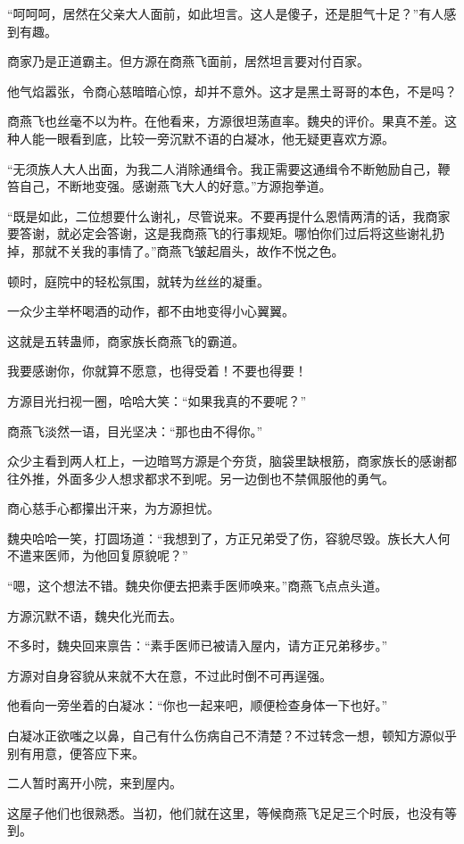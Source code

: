 \begin{this_body}
“呵呵呵，居然在父亲大人面前，如此坦言。这人是傻子，还是胆气十足？”有人感到有趣。

商家乃是正道霸主。但方源在商燕飞面前，居然坦言要对付百家。

他气焰嚣张，令商心慈暗暗心惊，却并不意外。这才是黑土哥哥的本色，不是吗？

商燕飞也丝毫不以为杵。在他看来，方源很坦荡直率。魏央的评价。果真不差。这种人能一眼看到底，比较一旁沉默不语的白凝冰，他无疑更喜欢方源。

“无须族人大人出面，为我二人消除通缉令。我正需要这通缉令不断勉励自己，鞭笞自己，不断地变强。感谢燕飞大人的好意。”方源抱拳道。

“既是如此，二位想要什么谢礼，尽管说来。不要再提什么恩情两清的话，我商家要答谢，就必定会答谢，这是我商燕飞的行事规矩。哪怕你们过后将这些谢礼扔掉，那就不关我的事情了。”商燕飞皱起眉头，故作不悦之色。

顿时，庭院中的轻松氛围，就转为丝丝的凝重。

一众少主举杯喝酒的动作，都不由地变得小心翼翼。

这就是五转蛊师，商家族长商燕飞的霸道。

我要感谢你，你就算不愿意，也得受着！不要也得要！

方源目光扫视一圈，哈哈大笑：“如果我真的不要呢？”

商燕飞淡然一语，目光坚决：“那也由不得你。”

众少主看到两人杠上，一边暗骂方源是个夯货，脑袋里缺根筋，商家族长的感谢都往外推，外面多少人想求都求不到呢。另一边倒也不禁佩服他的勇气。

商心慈手心都攥出汗来，为方源担忧。

魏央哈哈一笑，打圆场道：“我想到了，方正兄弟受了伤，容貌尽毁。族长大人何不遣来医师，为他回复原貌呢？”

“嗯，这个想法不错。魏央你便去把素手医师唤来。”商燕飞点点头道。

方源沉默不语，魏央化光而去。

不多时，魏央回来禀告：“素手医师已被请入屋内，请方正兄弟移步。”

方源对自身容貌从来就不大在意，不过此时倒不可再逞强。

他看向一旁坐着的白凝冰：“你也一起来吧，顺便检查身体一下也好。”

白凝冰正欲嗤之以鼻，自己有什么伤病自己不清楚？不过转念一想，顿知方源似乎别有用意，便答应下来。

二人暂时离开小院，来到屋内。

这屋子他们也很熟悉。当初，他们就在这里，等候商燕飞足足三个时辰，也没有等到。


\end{this_body}

